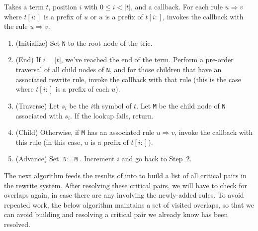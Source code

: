 \documentclass[../generics]{subfiles}
\begin{document}
\begin{algorithm}\label{overlap trie lookup}
Takes a term $t$, position $i$ with $0\leq i<|t|$, and a callback. For each rule $u\Rightarrow v$ where $t[i:]$ is a prefix of $u$ or $u$ is a prefix of $t[i:]$, invokes the callback with the rule $u\Rightarrow v$.
\begin{enumerate}
\item (Initialize) Set \texttt{N} to the root node of the trie.
\item (End) If $i=|t|$, we've reached the end of the term. Perform a pre-order traversal of all child nodes of \texttt{N}, and for those children that have an associated rewrite rule, invoke the callback with that rule (this is the case where $t[i:]$ is a prefix of each $u$).
\item (Traverse) Let $s_i$ be the $i$th symbol of $t$. Let \texttt{M} be the child node of \texttt{N} associated with $s_i$. If the lookup fails, return.
\item (Child) Otherwise, if \texttt{M} has an associated rule $u\Rightarrow v$, invoke the callback with this rule (in this case, $u$ is a prefix of $t[i:]$).
\item (Advance) Set $\texttt{N}:=\texttt{M}$. Increment $i$ and go back to Step~2.
\end{enumerate}
\end{algorithm}

The next algorithm feeds the results of  into  to build a list of all critical pairs in the rewrite system. After resolving these critical pairs, we will have to check for overlaps again, in case there are any involving the newly-added rules. To avoid repeated work,  the below algorithm maintains a set of visited overlaps, so that we can avoid building and resolving a critical pair we already know has been resolved.
\end{document}
